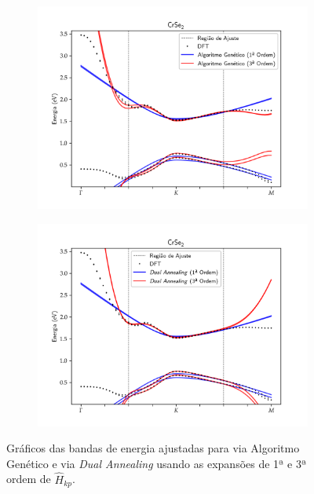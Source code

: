 \begin{figure}[p]
  \centering
  \begin{subfigure}{\textwidth}
    \includegraphics[trim=0 0.6cm 0 0.6cm,clip,width=\textwidth]{imagens/crse2_genetic_algorithm_order_13.png}
    \caption{}
    \label{fig:crse2_genetic_algorithm}
  \end{subfigure}
  \begin{subfigure}{\textwidth}
    \includegraphics[trim=0 0.6cm 0 0.6cm,clip,width=\textwidth]{imagens/crse2_dual_annealing_order_13.png}
    \caption{}
    \label{fig:crse2_dual_annealing}
  \end{subfigure}
  \caption{
    Gráficos das bandas de energia ajustadas para  via Algoritmo Genético
     e via \textit{Dual Annealing}
     usando as expansões de 1ª e 3ª ordem de $ \hat{H}_{kp} $.
  }
  \label{fig:crse2}
\end{figure}

